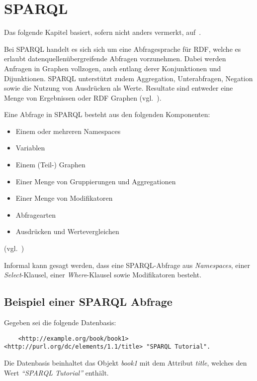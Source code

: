 \chapter{SPARQL}
\label{chap:sparql}
Das folgende Kapitel basiert, sofern nicht anders vermerkt, auf~\cite{w3sparql_querylang}.

Bei SPARQL handelt es sich sich um eine Abfragesprache für RDF, welche es erlaubt datenquellenübergreifende Abfragen vorzunehmen. Dabei werden Anfragen in Graphen vollzogen, auch entlang derer Konjunktionen und Dijunktionen. SPARQL unterstützt zudem Aggregation, Unterabfragen, Negation sowie die Nutzung von Ausdrücken als Werte. Resultate sind entweder eine Menge von Ergebnissen oder RDF Graphen (vgl.~\cite[Abstract]{w3sparql_querylang}).

Eine Abfrage in SPARQL besteht aus den folgenden Komponenten:
\begin{itemize}
    \item Einem oder mehreren Namespaces
    \item Variablen
    \item Einem (Teil-) Graphen
    \item Einer Menge von Gruppierungen und Aggregationen
    \item Einer Menge von Modifikatoren
    \item Abfragearten
    \item Ausdrücken und Wertevergleichen
\end{itemize}
(vgl.~\cite[18.1.10 SPARQL Query]{w3sparql_querylang})

Informal kann gesagt werden, dass eine SPARQL-Abfrage aus \textit{Namespaces}, einer \textit{Select}-Klausel, einer \textit{Where}-Klausel sowie Modifikatoren besteht.

\section{Beispiel einer SPARQL Abfrage}
\label{sec:sparql_beispiel}

Gegeben sei die folgende Datenbasis:
\lstset{language=XML}
\begin{lstlisting}
    <http://example.org/book/book1> <http://purl.org/dc/elements/1.1/title> "SPARQL Tutorial".
\end{lstlisting}

Die Datenbasis beinhaltet das Objekt \textit{book1} mit dem Attribut \textit{title}, welches den Wert \textit{``SPARQL Tutorial''} enthält.

